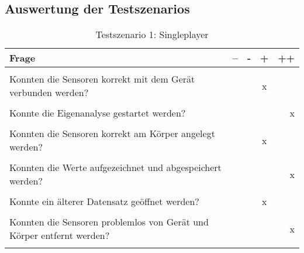\subsection{Auswertung der Testszenarios}
\begin{table}[h!tp]
	\begin{center}
		\begin{tabular}{@{}|l|c|c|c|r|@{}}
			\hline
			Frage & -- & - & + & ++ \\
			\hline
			 & & & & \\
			Konnten die Sensoren korrekt mit dem Gerät verbunden werden? & & & x & \\
			 & & & & \\
			Konnte die Eigenanalyse gestartet werden? & & & & x \\
			 & & & & \\
			Konnten die Sensoren korrekt am Körper angelegt werden? & & & x & \\
			 & & & & \\
			Konnten die Werte aufgezeichnet und abgespeichert werden? & & & & x \\
			 & & & & \\
			Konnte ein älterer Datensatz geöffnet werden? & & & x & \\
			 & & & & \\
			Konnten die Sensoren problemlos von Gerät und Körper entfernt werden? & & & & x\\
			 & & & & \\
			\hline
		\end{tabular}
	\end{center}
	\caption{Testszenario 1: Singleplayer}
	\label{tab_test_singleplayer}
\end{table}


